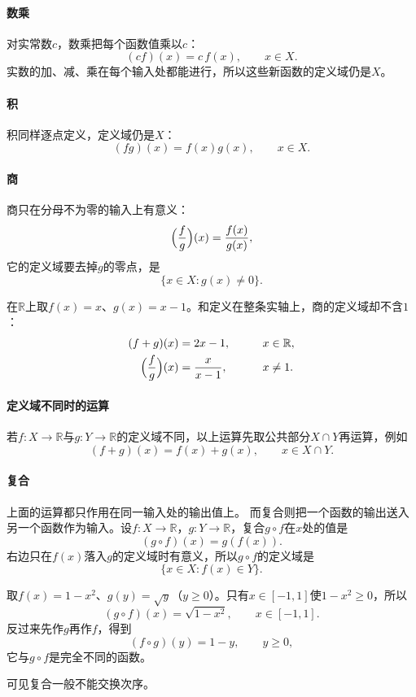 \paragraph{数乘}
对实常数$c$，数乘把每个函数值乘以$c$：
\[
 (cf)(x)=c\,f(x),\qquad x\in X.
\]
实数的加、减、乘在每个输入处都能进行，所以这些新函数的定义域仍是$X$。

\paragraph{积}
积同样逐点定义，定义域仍是$X$：
\[
 (fg)(x)=f(x)g(x),\qquad x\in X.
\]

\paragraph{商}
商只在分母不为零的输入上有意义：
\[
 \Bigl(\frac fg\Bigr)(x)=\frac{f(x)}{g(x)},
\]
它的定义域要去掉$g$的零点，是
\[
 \{x\in X:g(x)\neq0\}.
\]
\begin{example}[和与商的定义域]
\label{ex:ru-sum-quotient-domain}
在$\mathbb R$上取$f(x)=x$、$g(x)=x-1$。和定义在整条实轴上，商的定义域却不含$1$：
\[
 \begin{aligned}
 (f+g)(x)&=2x-1, &\qquad x&\in\mathbb R,\\
 \Bigl(\frac fg\Bigr)(x)&=\frac{x}{x-1}, &\qquad x&\neq1.
 \end{aligned}
\]
\end{example}

\paragraph{定义域不同时的运算}
若$f:X\to\mathbb R$与$g:Y\to\mathbb R$的定义域不同，以上运算先取公共部分$X\cap Y$再运算，例如
\[
 (f+g)(x)=f(x)+g(x),\qquad x\in X\cap Y.
\]

\paragraph{复合}
上面的运算都只作用在同一输入处的输出值上。
而复合则把一个函数的输出送入另一个函数作为输入。设$f:X\to\mathbb R$，$g:Y\to\mathbb R$，复合$g\circ f$在$x$处的值是
\[
 (g\circ f)(x)=g(f(x)).
\]
右边只在$f(x)$落入$g$的定义域时有意义，所以$g\circ f$的定义域是
\[
 \{x\in X:f(x)\in Y\}.
\]
\begin{example}[复合的定义域与次序]
\label{ex:ru-composition-domain-order}
取$f(x)=1-x^2$、$g(y)=\sqrt y$（$y\geq0$）。只有$x\in[-1,1]$使$1-x^2\geq0$，所以
\[
 (g\circ f)(x)=\sqrt{1-x^2},\qquad x\in[-1,1].
\]
反过来先作$g$再作$f$，得到
\[
 (f\circ g)(y)=1-y,\qquad y\geq0,
\]
它与$g\circ f$是完全不同的函数。
\end{example}
可见复合一般不能交换次序。

